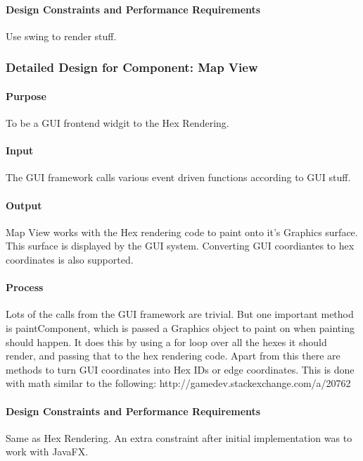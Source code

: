\documentclass[12pt,a4paper,titlepage]{article}
\begin{document}
\paragraph{Design Constraints and Performance Requirements}
Use swing to render stuff.

\subsubsection{Detailed Design for Component: Map View}
\paragraph{Purpose} To be a GUI frontend widgit to the Hex Rendering.
\paragraph{Input}
The GUI framework calls various event driven functions according to GUI stuff.
\paragraph{Output}
Map View works with the Hex rendering code to paint onto it's Graphics surface.
This surface is displayed by the GUI system.
Converting GUI coordiantes to hex coordinates is also supported.
\paragraph{Process}
Lots of the calls from the GUI framework are trivial. But one important 
method is paintComponent, which is passed a Graphics object to paint on when
painting should happen. It does this by using a for loop over all the hexes
it should render, and passing that to the hex rendering code.
Apart from this there are methods to turn GUI coordinates into Hex IDs or 
edge coordinates. This is done with math similar to the following:
http://gamedev.stackexchange.com/a/20762
\paragraph{Design Constraints and Performance Requirements}
Same as Hex Rendering. An extra constraint after initial implementation was to
work with JavaFX.
\end{document}
